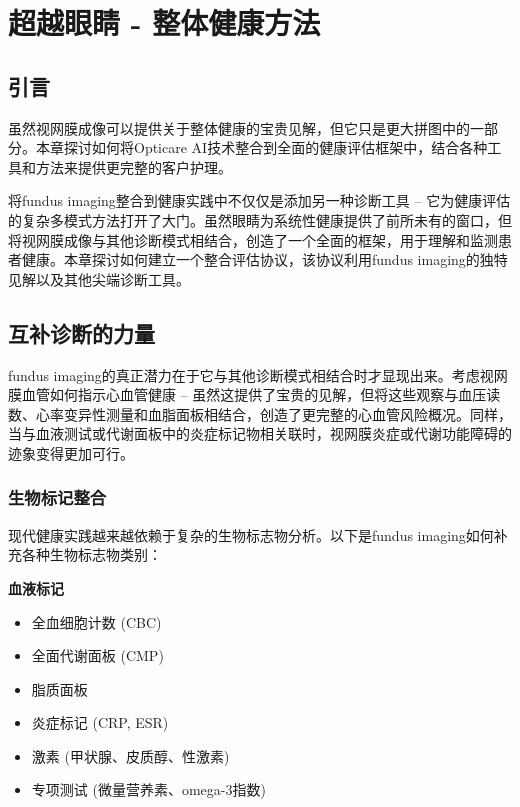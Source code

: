 \documentclass[
  Letterpaper,
]{scrbook}
\providecommand{\tightlist}{%
  \setlength{\itemsep}{0pt}\setlength{\parskip}{0pt}}\usepackage{longtable,booktabs,array}
\begin{document}

\chapter{超越眼睛 -
整体健康方法}\label{ux8d85ux8d8aux773cux775b---ux6574ux4f53ux5065ux5eb7ux65b9ux6cd5}

\section{引言}\label{ux5f15ux8a00-2}

虽然视网膜成像可以提供关于整体健康的宝贵见解，但它只是更大拼图中的一部分。本章探讨如何将Opticare
AI技术整合到全面的健康评估框架中，结合各种工具和方法来提供更完整的客户护理。

将fundus imaging整合到健康实践中不仅仅是添加另一种诊断工具 --
它为健康评估的复杂多模式方法打开了大门。虽然眼睛为系统性健康提供了前所未有的窗口，但将视网膜成像与其他诊断模式相结合，创造了一个全面的框架，用于理解和监测患者健康。本章探讨如何建立一个整合评估协议，该协议利用fundus
imaging的独特见解以及其他尖端诊断工具。

\section{互补诊断的力量}\label{ux4e92ux8865ux8bcaux65adux7684ux529bux91cf}

fundus
imaging的真正潜力在于它与其他诊断模式相结合时才显现出来。考虑视网膜血管如何指示心血管健康
--
虽然这提供了宝贵的见解，但将这些观察与血压读数、心率变异性测量和血脂面板相结合，创造了更完整的心血管风险概况。同样，当与血液测试或代谢面板中的炎症标记物相关联时，视网膜炎症或代谢功能障碍的迹象变得更加可行。

\subsection{生物标记整合}\label{ux751fux7269ux6807ux8bb0ux6574ux5408}

现代健康实践越来越依赖于复杂的生物标志物分析。以下是fundus
imaging如何补充各种生物标志物类别：

\textbf{血液标记}

\begin{itemize}
\tightlist
\item
  全血细胞计数 (CBC)
\item
  全面代谢面板 (CMP)
\item
  脂质面板
\item
  炎症标记 (CRP, ESR)
\item
  激素 (甲状腺、皮质醇、性激素)
\item
  专项测试 (微量营养素、omega-3指数)
\end{itemize}
\end{document}
